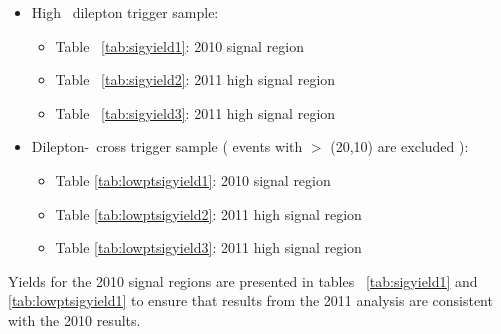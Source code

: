 \begin{itemize}
  \item High \pt\ dilepton trigger sample:
    \begin{itemize}
      \item Table ~\ref{tab:sigyield1}: 2010 signal region
      \item Table ~\ref{tab:sigyield2}: 2011 high \met signal region
      \item Table ~\ref{tab:sigyield3}: 2011 high \Ht signal region
    \end{itemize}
  \item Dilepton-\Ht\ cross trigger sample ( events with \pt $>$ (20,10) are excluded ):
    \begin{itemize}
         \item Table \ref{tab:lowptsigyield1}: 2010 signal region
         \item Table \ref{tab:lowptsigyield2}: 2011 high \met signal region
         \item Table \ref{tab:lowptsigyield3}: 2011 high \Ht signal region
    \end{itemize}
\end{itemize}

Yields for the 2010 signal regions are presented in tables ~\ref{tab:sigyield1} and \ref{tab:lowptsigyield1}
to ensure that results from the 2011 analysis are consistent with the 2010 results.

\clearpage

